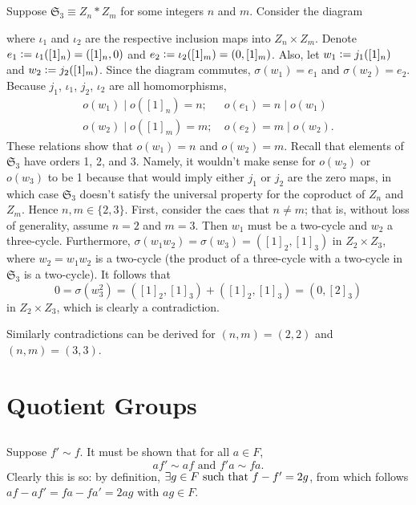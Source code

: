 \documentclass[12pt]{article}
\begin{document}
\subsection{} 
\renewcommand{\grp}{\mathfrak{S}_3}
Suppose $\grp \equiv Z_n * Z_m$ for some integers $n$ and $m$. 
Consider the diagram 
\begin{center}
  \coproduct{Z_n}{Z_m}{\grp}{Z_n \times Z_m}{j_1}{\iota_1}{j_2}{\iota_2}{\sigma}
\end{center}
where $\iota_1$ and $\iota_2$ are the respective inclusion maps into $Z_n \times Z_m$. 
Denote $e_1 \vcentcolon= \iota_1([1]_n) = ([1]_n, 0)$ and $e_2 \vcentcolon= \iota_2([1]_m) = (0, [1]_m)$. 
Also, let $w_1 \vcentcolon= j_1([1]_n)$ and $w_2 \vcentcolon= j_2([1]_m)$. 
Since the diagram commutes, $\sigma(w_1) = e_1$ and $\sigma(w_2) = e_2$. 
Because $j_1$, $\iota_1$, $j_2$, $\iota_2$ are all homomorphisms, 
\begin{align*}
  o(w_1) \mid o([1]_n) = n; \: & o(e_1) = n \mid o(w_1) \\ 
  o(w_2) \mid o([1]_m) = m; \: & o(e_2) = m \mid o(w_2).
\end{align*}
These relations show that $o(w_1) = n$ and $o(w_2) = m$. 
Recall that elements of $\grp$ have orders 1, 2, and 3. 
Namely, it wouldn't make sense for $o(w_2)$ or $o(w_3)$ to be 1 because that would imply either $j_1$ or $j_2$ are the zero maps, in which case $\grp$ doesn't satisfy the universal property for the coproduct of $Z_n$ and $Z_m$.  
Hence $n, m \in \{2, 3\}$. 
First, consider the caes that $n \neq m$; 
that is, without loss of generality, assume $n = 2$ and $m = 3$. 
Then $w_1$ must be a two-cycle and $w_2$ a three-cycle. 
Furthermore, $\sigma(w_1 w_2) = \sigma(w_3) = ([1]_{2}, [1]_3)$ in $Z_2 \times Z_3$, where $w_2 = w_1 w_2$ is a two-cycle (the product of a three-cycle with a two-cycle in $\grp$ is a two-cycle).
It follows that 
$$0 = \sigma(w_{3}^{2}) = ([1]_{2}, [1]_{3}) + ([1]_{2}, [1]_{3}) = (0, [2]_{3})$$
in $Z_2 \times Z_3$, which is clearly a contradiction. 

Similarly contradictions can be derived for $(n, m) = (2, 2)$ and $(n, m) = (3, 3)$.

\section{Quotient Groups} 
\setcounter{subsection}{3}
\subsection{} 
Suppose $f' \sim f$. 
It must be shown that for all $a \in F$, 
$$af' \sim af \text{ and } f'a \sim fa.$$
Clearly this is so: 
by definition, $\exists g \in F \text{ such that } f - f' = 2g$, from which follows $af - af' = fa - fa' = 2ag$ with $ag \in F$. 
\end{document}
